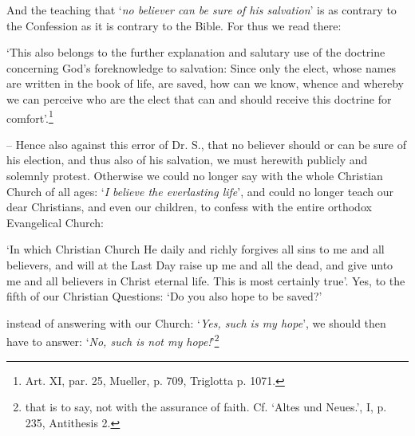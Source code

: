 \divider \begin{fancyquotes}
                And the teaching that ‘\textit{no believer can be sure of his salvation}’ is as contrary to the Confession as it is contrary to the Bible.  For thus we read there: \begin{displayquote}{\footnotesize ‘This also belongs to the further explanation and salutary use of the doctrine concerning God’s foreknowledge to salvation: Since only the elect, whose names are written in the book of life, are saved, how can we know, whence and whereby we can perceive who are the elect that can and should receive this doctrine for comfort’.}\footnote{Art. XI, par. 25, Mueller, p. 709, Triglotta p. 1071.}\end{displayquote} -- Hence also against this error of Dr. S., that no believer should or can be sure of his election, and thus also of his salvation, we must herewith publicly and solemnly protest.  Otherwise we could no longer say with the whole Christian Church of all ages: ‘\textit{I believe the everlasting life}’, and could no longer teach our dear Christians, and even our children, to confess with the entire orthodox Evangelical Church: \begin{displayquote}{\footnotesize ‘In which Christian Church He daily and richly forgives all sins to me and all believers, and will at the Last Day raise up me and all the dead, and give unto me and all believers in Christ eternal life.  This is most certainly true’.  Yes, to the fifth of our Christian Questions: ‘Do you also hope to be saved?’}\end{displayquote} instead of answering with our Church: ‘\textit{Yes, such is my hope}’, we should then have to answer: ‘\textit{No, such is not my hope!}’\footnote{that is to say, not with the assurance of faith. Cf. ‘Altes und Neues.’, I, p. 235, Antithesis 2.}\end{fancyquotes}

